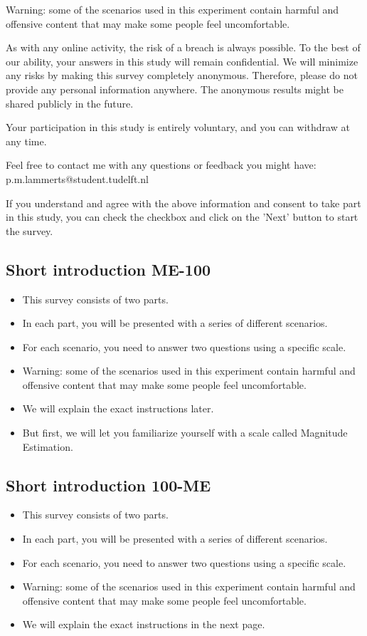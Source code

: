 \documentclass[a4paper]{article}
\begin{document}
Warning: some of the scenarios used in this experiment contain harmful and offensive content that may make some people feel uncomfortable.

As with any online activity, the risk of a breach is always possible. To the best of our ability, your answers in this study will remain confidential. We will minimize any risks by making this survey completely anonymous. Therefore, please do not provide any personal information anywhere. The anonymous results might be shared publicly in the future.

Your participation in this study is entirely voluntary, and you can withdraw at any time.

Feel free to contact me with any questions or feedback you might have:
p.m.lammerts@student.tudelft.nl

If you understand and agree with the above information and consent to take part in this study, you can check the checkbox and click on the 'Next' button to start the survey.


\subsection{Short introduction ME-100}
\begin{itemize}
    \item This survey consists of two parts.
    \item In each part, you will be presented with a series of different scenarios.
    \item For each scenario, you need to answer two questions using a specific scale.
    \item Warning: some of the scenarios used in this experiment contain harmful and offensive content that may make some people feel uncomfortable.
    \item We will explain the exact instructions later.
    \item But first, we will let you familiarize yourself with a scale called Magnitude Estimation.
\end{itemize}

\subsection{Short introduction 100-ME}
\begin{itemize}
    \item This survey consists of two parts.
    \item In each part, you will be presented with a series of different scenarios.
    \item For each scenario, you need to answer two questions using a specific scale.
    \item Warning: some of the scenarios used in this experiment contain harmful and offensive content that may
          make some people feel uncomfortable.
    \item We will explain the exact instructions in the next page.
\end{itemize}
\end{document}
